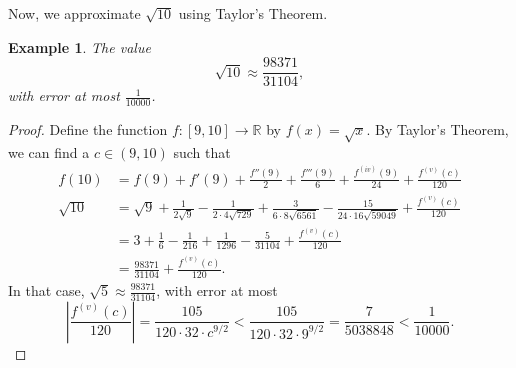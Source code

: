 \documentclass[a4paper, openany]{memoir}
\theoremstyle{definition}
\theoremstyle{plain}
\newtheorem{example}[definition]{Example}
\begin{document}
\noindent Now, we approximate $\sqrt{10}$ using Taylor's Theorem.
\begin{example}
The value
\[\sqrt{10} \approx \frac{98371}{31104},\]
with error at most $\frac{1}{10 000}$.
\end{example}
\begin{proof}
Define the function $f: [9, 10] \to \mathbb{R}$ by $f(x) = \sqrt{x}$. By Taylor's Theorem, we can find a $c \in (9, 10)$ such that
\begin{align*}
    f(10) &= f(9) + f'(9) + \frac{f''(9)}{2} + \frac{f'''(9)}{6} + \frac{f^{(iv)}(9)}{24} + \frac{f^{(v)}(c)}{120} \\
    \sqrt{10} &= \sqrt{9} + \frac{1}{2 \sqrt{9}} - \frac{1}{2 \cdot 4 \sqrt{729}} + \frac{3}{6 \cdot 8 \sqrt{6561}} - \frac{15}{24 \cdot 16\sqrt{59049}} + \frac{f^{(v)}(c)}{120} \\
    &= 3 + \frac{1}{6} - \frac{1}{216} + \frac{1}{1296} - \frac{5}{31104} + \frac{f^{(v)}(c)}{120} \\
    &= \frac{98371}{31104} + \frac{f^{(v)}(c)}{120}.
\end{align*}
In that case, $\sqrt{5} \approx \frac{98371}{31104}$, with error at most
\[\left|\frac{f^{(v)}(c)}{120}\right| = \frac{105}{120 \cdot 32 \cdot c^{9/2}} < \frac{105}{120 \cdot 32 \cdot 9^{9/2}} = \frac{7}{5038848} < \frac{1}{10000}.\]
\end{proof}
\end{document}
